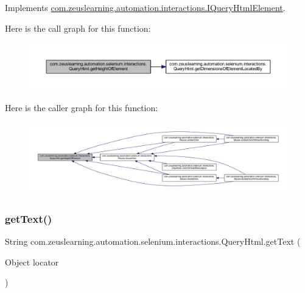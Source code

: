 Implements \hyperlink{interfacecom_1_1zeuslearning_1_1automation_1_1interactions_1_1IQueryHtmlElement_a26efb264ee85d373a3276484aafad86e}{com.\+zeuslearning.\+automation.\+interactions.\+I\+Query\+Html\+Element}.

Here is the call graph for this function\+:
\nopagebreak
\begin{figure}[H]
\begin{center}
\leavevmode
\includegraphics[width=350pt]{dc/d41/classcom_1_1zeuslearning_1_1automation_1_1selenium_1_1interactions_1_1QueryHtml_a768ebd5b4aac0a5de728e79a59ac9524_cgraph}
\end{center}
\end{figure}
Here is the caller graph for this function\+:
\nopagebreak
\begin{figure}[H]
\begin{center}
\leavevmode
\includegraphics[width=350pt]{dc/d41/classcom_1_1zeuslearning_1_1automation_1_1selenium_1_1interactions_1_1QueryHtml_a768ebd5b4aac0a5de728e79a59ac9524_icgraph}
\end{center}
\end{figure}
\hypertarget{classcom_1_1zeuslearning_1_1automation_1_1selenium_1_1interactions_1_1QueryHtml_a9635c7b4c91241fc2896d317ca4121ef}{}\label{classcom_1_1zeuslearning_1_1automation_1_1selenium_1_1interactions_1_1QueryHtml_a9635c7b4c91241fc2896d317ca4121ef} 
\subsubsection{\texorpdfstring{get\+Text()}{getText()}\hspace{0.1cm}{\footnotesize\ttfamily [1/2]}}
{\footnotesize\ttfamily String com.\+zeuslearning.\+automation.\+selenium.\+interactions.\+Query\+Html.\+get\+Text (\begin{DoxyParamCaption}\item[{Object}]{locator }\end{DoxyParamCaption})\hspace{0.3cm}{\ttfamily [inline]}}

